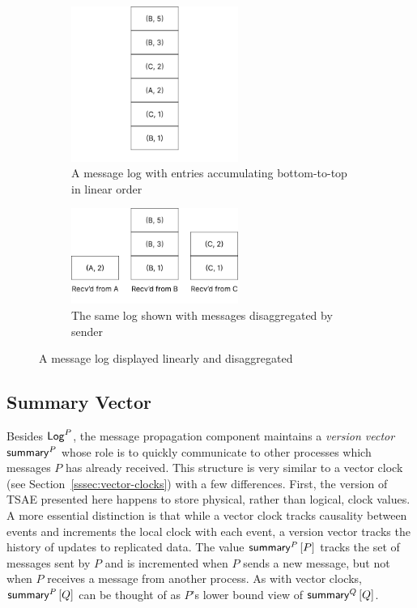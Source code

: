 \documentclass[]             %
{NASA}                       %
\theoremstyle{definition}
\begin{document}
\begin{figure}
  \setlength\belowcaptionskip{5ex}
  \begin{subfigure}{1\textwidth}
    \centering
    \includegraphics[width=0.6\textwidth]{images/MessageLog1.png}
    \caption{A message log with entries accumulating bottom-to-top in linear order}
    \label{fig:message-log-a}
  \end{subfigure}
  \begin{subfigure}{1\textwidth}
    \centering
    \includegraphics[width=0.6\textwidth]{images/MessageLog2.png}
    \caption{The same log shown with messages disaggregated by sender}
    \label{fig:message-log-b}
  \end{subfigure}
  \caption{A message log displayed linearly and disaggregated}
  \label{fig:message-log}
\end{figure}


\subsection{Summary Vector}
\label{ssec:tsae-summary-vectors}
Besides $\mathsf{Log}^{P}$, the message propagation component maintains a
\emph{version vector} $\mathsf{summary}^{P}$ whose role is to quickly
communicate to other processes which messages $P$ has already
received. This structure is very similar to a vector clock (see
Section~\ref{sssec:vector-clocks}) with a few differences. First, the
version of TSAE presented here happens to store physical, rather than
logical, clock values. A more essential distinction is that while a
vector clock tracks causality between events and increments the local
clock with each event, a version vector tracks the history of updates
to replicated data. The value $\mathsf{summary}^{P}\left[P\right]$ tracks the set of
messages sent by $P$ and is incremented when $P$ sends a new message,
but not when $P$ receives a message from another process. As with
vector clocks, $\mathsf{summary}^{P}\left[Q\right]$ can be thought of as $P$'s lower bound
view of $\mathsf{summary}^{Q}\left[Q\right]$.
\end{document}
